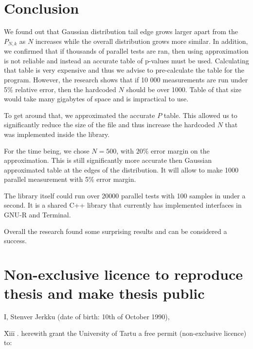 \documentclass[12pt]{article}
\begin{document}
{\section{Conclusion}
We found out that Gaussian distribution tail edge grows larger apart from the $P_{N, k}$ as $N$ increases while the overall distribution grows more similar. In addition, we confirmed that if thousands of parallel tests are ran, then using approximation is not reliable and instead an accurate table of p-values must be used. Calculating that table is very expensive and thus we advise to pre-calculate the table for the program. However, the research shows that if 10 000 measurements are run under 5\% relative error, then the hardcoded $N$ should be over 1000. Table of that size would take many gigabytes of space and is impractical to use.

To get around that, we approximated the accurate $P$ table. This allowed us to significantly reduce the size of the file and thus increase the hardcoded $N$ that was implemented inside the library.

For the time being, we chose $N=500$, with $20\%$ error margin on the approximation. This is still significantly more accurate then Gaussian approximated table at the edges of the distribution. It will allow to make 1000 parallel measurement with 5\% error margin.

The library itself could run over 20000 parallel tests with 100 samples in under a second. It is a shared C++ library that currently has implemented interfaces in GNU-R and Terminal.

Overall the research found some surprising results and can be considered a success.

\newpage




\appendix
\pagebreak

\section*{\small Non-exclusive licence to reproduce thesis and make thesis public}

I, Stenver Jerkku (date of birth: 10th of October 1990),

\begin{tabbing}
\= Xiii\=\kill
{}. \> herewith grant the University of Tartu a free permit (non-exclusive licence) to:\\\\


\end{tabbing}}
\end{document}

